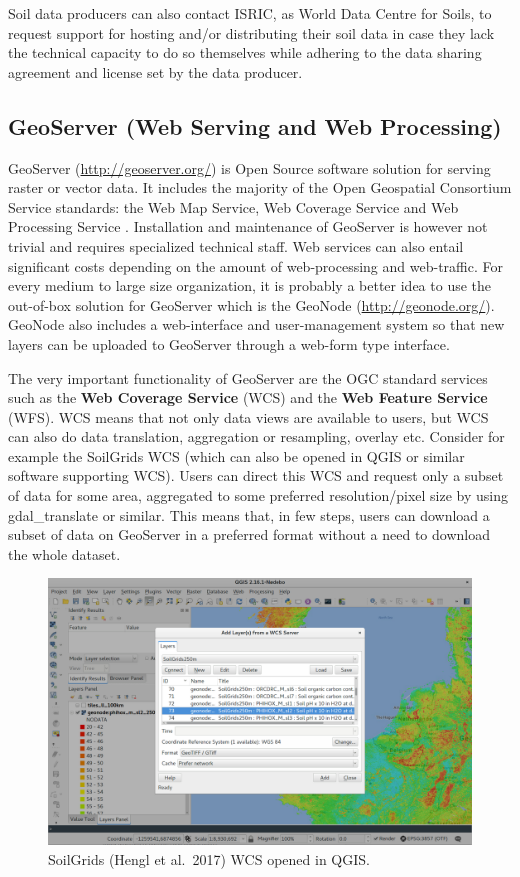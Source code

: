 \documentclass[10pt,b5paper,]{book}
\theoremstyle{definition}
\theoremstyle{definition}
\theoremstyle{definition}
\theoremstyle{remark}
\begin{document}
Soil data producers can also contact ISRIC, as World Data Centre for
Soils, to request support for hosting and/or distributing their soil
data in case they lack the technical capacity to do so themselves while
adhering to the data sharing agreement and license set by the data
producer.

\hypertarget{geoserver-web-serving-and-web-processing}{%
\subsection{GeoServer (Web Serving and Web
Processing)}\label{geoserver-web-serving-and-web-processing}}

GeoServer (\url{http://geoserver.org/}) is Open Source software solution
for serving raster or vector data. It includes the majority of the Open
Geospatial Consortium Service standards: the Web Map Service, Web
Coverage Service and Web Processing Service
\citep{youngblood2013geoserver}. Installation and maintenance of
GeoServer is however not trivial and requires specialized technical
staff. Web services can also entail significant costs depending on the
amount of web-processing and web-traffic. For every medium to large size
organization, it is probably a better idea to use the out-of-box
solution for GeoServer which is the GeoNode (\url{http://geonode.org/}).
GeoNode also includes a web-interface and user-management system so that
new layers can be uploaded to GeoServer through a web-form type
interface.

The very important functionality of GeoServer are the OGC standard
services such as the \textbf{Web Coverage Service} (WCS) and the
\textbf{Web Feature Service} (WFS). WCS means that not only data views
are available to users, but WCS can also do data translation,
aggregation or resampling, overlay etc. Consider for example the
SoilGrids WCS (which can also be opened in QGIS or similar software
supporting WCS). Users can direct this WCS and request only a subset of
data for some area, aggregated to some preferred resolution/pixel size
by using gdal\_translate or similar. This means that, in few steps,
users can download a subset of data on GeoServer in a preferred format
without a need to download the whole dataset.

\begin{figure}
\centering
\includegraphics{images/Data_sharing_SoilGrids.png}
\caption{SoilGrids (Hengl et al.~2017) WCS opened in QGIS.}
\end{figure}
\end{document}
